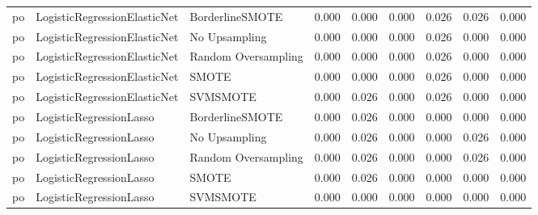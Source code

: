\begin{tabular}{lllllllll}
      po &    LogisticRegressionElasticNet &               BorderlineSMOTE &     0.000 &                     0.000 &                 0.000 &                  0.026 &                                   0.026 &     0.000 \\
      po &    LogisticRegressionElasticNet &                 No Upsampling &     0.000 &                     0.000 &                 0.000 &                  0.026 &                                   0.000 &     0.000 \\
      po &    LogisticRegressionElasticNet &           Random Oversampling &     0.000 &                     0.000 &                 0.000 &                  0.026 &                                   0.000 &     0.000 \\
      po &    LogisticRegressionElasticNet &                         SMOTE &     0.000 &                     0.000 &                 0.000 &                  0.026 &                                   0.000 &     0.000 \\
      po &    LogisticRegressionElasticNet &                      SVMSMOTE &     0.000 &                     0.026 &                 0.000 &                  0.026 &                                   0.000 &     0.000 \\
      po &         LogisticRegressionLasso &               BorderlineSMOTE &     0.000 &                     0.026 &                 0.000 &                  0.000 &                                   0.000 &     0.000 \\
      po &         LogisticRegressionLasso &                 No Upsampling &     0.000 &                     0.026 &                 0.000 &                  0.000 &                                   0.026 &     0.000 \\
      po &         LogisticRegressionLasso &           Random Oversampling &     0.000 &                     0.026 &                 0.000 &                  0.000 &                                   0.026 &     0.000 \\
      po &         LogisticRegressionLasso &                         SMOTE &     0.000 &                     0.026 &                 0.000 &                  0.000 &                                   0.000 &     0.000 \\
      po &         LogisticRegressionLasso &                      SVMSMOTE &     0.000 &                     0.000 &                 0.000 &                  0.000 &                                   0.000 &     0.000 \\

\end{tabular}

